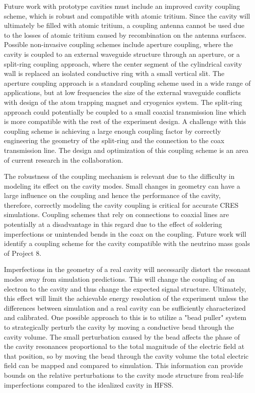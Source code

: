 Future work with prototype cavities must include an improved cavity coupling scheme, which is robust and compatible with atomic tritium. Since the cavity will ultimately be filled with atomic tritium, a coupling antenna cannot be used due to the losses of atomic tritium caused by recombination on the antenna surfaces. Possible non-invasive coupling schemes include aperture coupling, where the cavity is coupled to an external waveguide structure through an aperture, or a split-ring coupling approach, where the center segment of the cylindrical cavity wall is replaced an isolated conductive ring with a small vertical slit. The aperture coupling approach is a standard coupling scheme \cite{pozar} used in a wide range of applications, but at low frequencies the size of the external waveguide conflicts with design of the atom trapping magnet and cryogenics system. The split-ring approach could potentially be coupled to a small coaxial transmission line which is more compatible with the rest of the experiment design. A challenge with this coupling scheme is achieving a large enough coupling factor by correctly engineering the geometry of the split-ring and the connection to the coax transmission line. The design and optimization of this coupling scheme is an area of current research in the collaboration.

The robustness of the coupling mechanism is relevant due to the difficulty in modeling its effect on the cavity modes. Small changes in geometry can have a large influence on the coupling and hence the performance of the cavity, therefore, correctly modeling the cavity coupling is critical for accurate CRES simulations. Coupling schemes that rely on connections to coaxial lines are potentially at a disadvantage in this regard due to the effect of soldering imperfections or unintended bends in the coax on the coupling. Future work will identify a coupling scheme for the cavity compatible with the neutrino mass goals of Project 8.

Imperfections in the geometry of a real cavity will necessarily distort the resonant modes away from simulation predictions. This will change the coupling of an electron to the cavity and thus change the expected signal structure. Ultimately, this effect will limit the achievable energy resolution of the experiment unless the differences between simulation and a real cavity can be sufficiently characterized and calibrated. One possible approach to this is to utilize a "bead puller" system \cite{bead_pull} to strategically perturb the cavity by moving a conductive bead through the cavity volume. The small perturbation caused by the bead affects the phase of the cavity resonances proportional to the total magnitude of the electric field at that position, so by moving the bead through the cavity volume the total electric field can be mapped and compared to simulation. This information can provide bounds on the relative perturbations to the cavity mode structure from real-life imperfections compared to the idealized cavity in HFSS.
